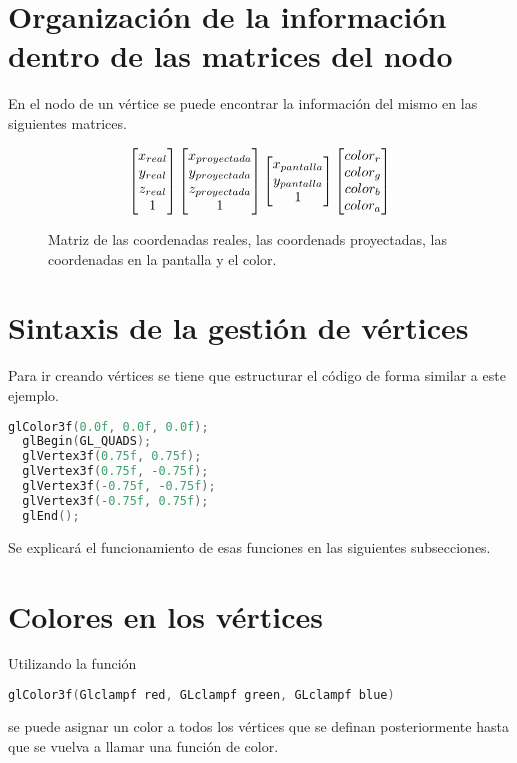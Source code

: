 \section{Organización de la información dentro de las matrices del nodo}
En el nodo de un vértice se puede encontrar la información del mismo en las siguientes matrices.
\begin{figure}[ht]
  \[
  \centering
  \begin{bmatrix}
    x_{real} \\
    y_{real} \\
    z_{real}  \\
    1 
  \end{bmatrix}
  \begin{bmatrix}
    x_{proyectada} \\
    y_{proyectada} \\
    z_{proyectada} \\
    1
  \end{bmatrix}
  \begin{bmatrix}
    x_{pantalla} \\
    y_{pantalla} \\
    1
  \end{bmatrix}
  \begin{bmatrix}
    color_r \\
    color_g \\
    color_b \\
    color_a
  \end{bmatrix}
  \]
  \caption{Matriz de las coordenadas reales, las coordenads proyectadas, las coordenadas en la pantalla y el color.}
\end{figure}
\section{Sintaxis de la gestión de vértices}
Para ir creando vértices se tiene que estructurar el código de forma similar a este ejemplo.
\begin{lstlisting}[language=C]
  glColor3f(0.0f, 0.0f, 0.0f);
  glBegin(GL_QUADS);
  glVertex3f(0.75f, 0.75f);
  glVertex3f(0.75f, -0.75f);
  glVertex3f(-0.75f, -0.75f);
  glVertex3f(-0.75f, 0.75f);
  glEnd();
\end{lstlisting}
Se explicará el funcionamiento de esas funciones en las siguientes subsecciones.
\section{Colores en los vértices}
Utilizando la función
\begin{lstlisting}[language=C]
  glColor3f(Glclampf red, GLclampf green, GLclampf blue)
\end{lstlisting}
se puede asignar un color a todos los vértices que se definan posteriormente hasta que se vuelva a llamar una función de color.

